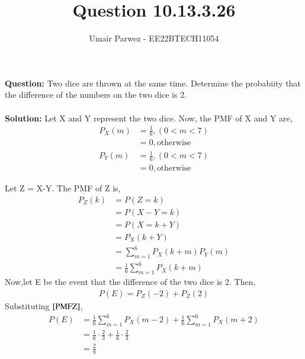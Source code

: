\documentclass[journal,12pt,twocolumn]{IEEEtran}
\theoremstyle{remark}
\begin{document}
%




\vspace{3cm}

\title{
Question 10.13.3.26
}
\author{Umair Parwez - EE22BTECH11054}	

\maketitle

\newpage

\bigskip

\renewcommand{\thefigure}{\theenumi}
\renewcommand{\thetable}{\theenumi}



\textbf{Question:} Two dice are thrown at the same time. Determine the probabiity that the difference
of the numbers on the two dice is 2. 
\\
\\
\textbf{Solution:}
Let X and Y represent the two dice.
Now, the PMF of X and Y are,
\begin{align}
	P_X(m) &= \frac{1}{6}, (0<m<7) \\
  &= 0, \text{otherwise} \\
  P_Y(m) &= \frac{1}{6}, (0<m<7) \\
  &= 0, \text{otherwise}
\end{align}

Let Z = X-Y. The PMF of Z is,
\begin{align}
  P_Z(k) &= P(Z=k)\\
  &= P(X-Y=k)\\
  &= P(X=k+Y)\\
  &= P_X(k+Y)\\
  &= \sum_{m=1}^{6} P_X(k+m)P_Y(m)\\
  &= \frac{1}{6} \sum_{m=1}^{6} P_X(k+m) \label{PMFZ}
\end{align}
Now,let E be the event that the difference of the two dice is 2. Then,
\begin{align}
  P(E) = P_Z(-2) + P_Z(2) 
\end{align}
Substituting $\eqref{PMFZ}$, 
\begin{align}
  P(E) &= \frac{1}{6} \sum_{m=1}^{6} P_X(m-2) + \frac{1}{6} \sum_{m=1}^{6} P_X(m+2)\\
  &= \frac{1}{6} \cdot \frac{2}{3} + \frac{1}{6} \cdot \frac{2}{3}\\
  &= \frac{2}{9}
\end{align}
\end{document}
